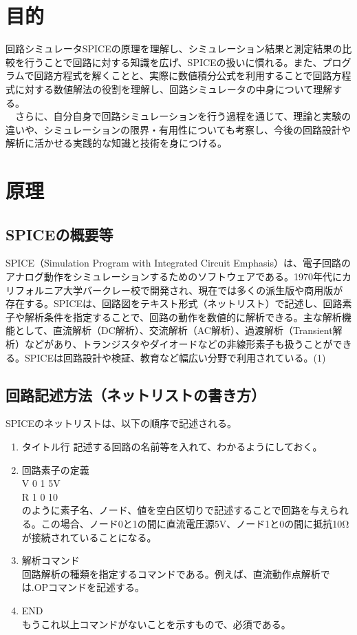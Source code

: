 \documentclass{jlreq}
\numberwithin{equation}{section}
\begin{document}
\section{目的}
回路シミュレータSPICEの原理を理解し、シミュレーション結果と測定結果の比較を行うことで回路に対する知識を広げ、SPICEの扱いに慣れる。また、プログラムで回路方程式を解くことと、実際に数値積分公式を利用することで回路方程式に対する数値解法の役割を理解し、回路シミュレータの中身について理解する。\\
　さらに、自分自身で回路シミュレーションを行う過程を通じて、理論と実験の違いや、シミュレーションの限界・有用性についても考察し、今後の回路設計や解析に活かせる実践的な知識と技術を身につける。

\section{原理}
\subsection{SPICEの概要等}
SPICE（Simulation Program with Integrated Circuit Emphasis）は、電子回路のアナログ動作をシミュレーションするためのソフトウェアである。1970年代にカリフォルニア大学バークレー校で開発され、現在では多くの派生版や商用版が存在する。SPICEは、回路図をテキスト形式（ネットリスト）で記述し、回路素子や解析条件を指定することで、回路の動作を数値的に解析できる。主な解析機能として、直流解析（DC解析）、交流解析（AC解析）、過渡解析（Transient解析）などがあり、トランジスタやダイオードなどの非線形素子も扱うことができる。SPICEは回路設計や検証、教育など幅広い分野で利用されている。(1)

\subsection{回路記述方法（ネットリストの書き方）}
SPICEのネットリストは、以下の順序で記述される。
\begin{enumerate}
  \item タイトル行 
  記述する回路の名前等を入れて、わかるようにしておく。
  \item 回路素子の定義 \\
  V 0 1 5V \\
  R 1 0 10 \\
  のように素子名、ノード、値を空白区切りで記述することで回路を与えられる。この場合、ノード0と1の間に直流電圧源5V、ノード1と0の間に抵抗10Ωが接続されていることになる。
  \item 解析コマンド　\\
  回路解析の種類を指定するコマンドである。例えば、直流動作点解析では.OPコマンドを記述する。
  \item END \\
  もうこれ以上コマンドがないことを示すもので、必須である。
\end{enumerate}
\end{document}
